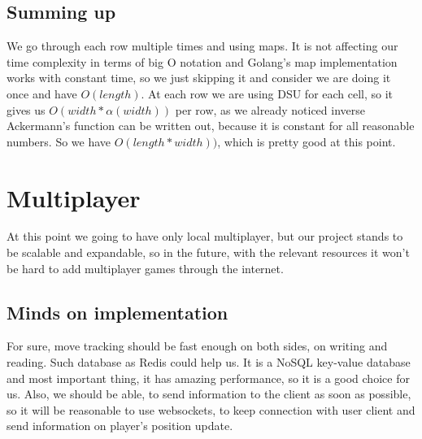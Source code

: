 	\subsection{Summing up}
	We go through each row multiple times and using maps. It is not affecting our time complexity in terms of big O notation and Golang's map implementation works with constant time, so we just skipping it and consider we are doing it once and have $O(length)$. At each row we are using DSU for each cell, so it gives us $O(width*\alpha{}(width))$ per row, as we already noticed inverse Ackermann's function can be written out, because it is constant for all reasonable numbers. So we have $O(length*width))$, which is pretty good at this point.
	
\section{Multiplayer}
	At this point we going to have only local multiplayer, but our project stands to be scalable and expandable, so in the future, with the relevant resources it won't be hard to add multiplayer games through the internet.
	\subsection{Minds on implementation}
		For sure, move tracking should be fast enough on both sides, on writing and reading. Such database as Redis \cite{Redis} could help us. It is a NoSQL key-value database and most important thing, it has amazing performance, so it is a good choice for us. Also, we should be able, to send information to the client as soon as possible, so it will be reasonable to use websockets, to keep connection with user client and send information on player's position update.